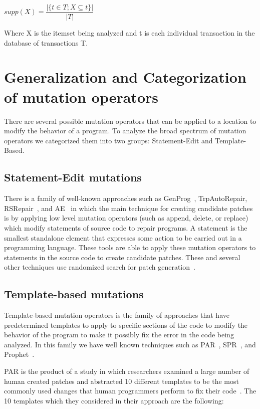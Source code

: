 \documentclass[conference]{IEEEtran}
\begin{document}
\begin{center}
$supp(X) = \dfrac{|\{t \in T; X \subseteq t\}|}{|T|}$
\end{center}

Where X is the itemset being analyzed and t is each individual transaction in the database of transactions T. 

\section{Generalization and Categorization of mutation operators} 
\label{categorization}

There are several possible mutation operators that can be applied to a location 
to modify the behavior of a program. To analyze the broad 
spectrum of mutation operators we categorized them into two groups: 
Statement-Edit and Template-Based. 

\subsection{Statement-Edit mutations}
There is a family of well-known approaches such as GenProg~\cite{legoues12}, 
TrpAutoRepair\cite{Qi13}, RSRepair~\cite{Qi14}, and AE~\cite{Weimer13} in which the main technique for 
creating candidate 
patches is by applying low level mutation operators (such as append, delete, or 
replace) which modify statements of source code to 
repair programs. A statement is the smallest standalone element that expresses 
some action to be carried out in a programming language. These tools are able to 
apply these mutation operators to statements in the source code to 
create candidate patches. These and several other techniques use randomized 
search for patch generation~\cite{arcuri08,bradbury10,Qi14,Weimer13}. 

\subsection{Template-based mutations}
Template-based mutation operators is the family of approaches that have 
predetermined templates to apply to specific sections of the code to 
modify the behavior of the program to make it possibly fix the error in the 
code being analyzed. In this family we have well known techniques such as PAR~\cite{kim2013}, 
SPR~\cite{fan15}, and 
Prophet~\cite{Long2016}.
 
PAR is the product of a study in which researchers examined a large number of 
human 
created patches and abstracted 10 different templates to be the most 
commonly used changes that human programmers perform to fix their 
code~\cite{kim2013}.
The 10 templates which they considered in their approach are the following:
\end{document}
